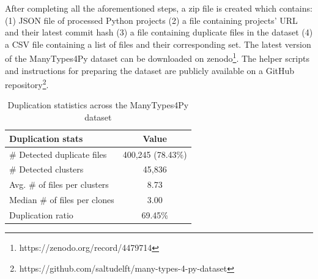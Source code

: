 \documentclass[10pt, conference]{IEEEtran}
\begin{document}
After completing all the aforementioned steps, a zip file is created which contains: (1) JSON file of processed Python projects (2) a file containing projects' URL and their latest commit hash (3) a file containing duplicate files in the dataset (4) a CSV file containing a list of files and their corresponding set. The latest version of the ManyTypes4Py dataset can be downloaded on zenodo\footnote{https://zenodo.org/record/4479714}. The helper scripts and instructions for preparing the dataset are publicly available on a GitHub repository\footnote{https://github.com/saltudelft/many-types-4-py-dataset}.

\begin{table}[!t]
	\centering
	\caption{Duplication statistics across the ManyTypes4Py dataset}
	\label{tab:dup-stats}
	\begin{tabular}{l c}
		\toprule
		Duplication stats & Value \\
		\midrule
		\# Detected duplicate files & 400,245 (78.43\%) \\
		\# Detected clusters & 45,836 \\
		Avg. \# of files per clusters & 8.73 \\
		Median \# of files per clones & 3.00 \\
		Duplication ratio & 69.45\% \\
		\bottomrule
	\end{tabular}
\end{table}
\end{document}
